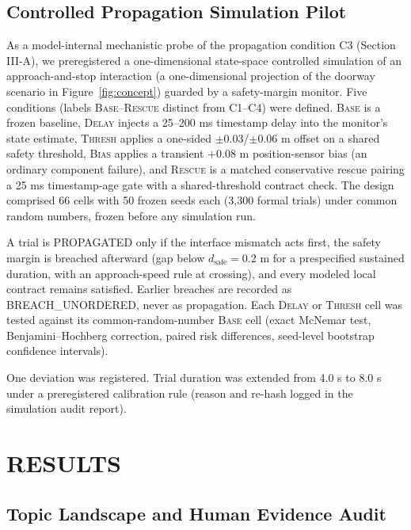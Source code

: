 \documentclass[letterpaper,9pt,conference]{ieeeconf}
\begin{document}
\subsection{Controlled Propagation Simulation Pilot}
As a model-internal mechanistic probe of the propagation condition C3 (Section III-A), we preregistered a one-dimensional state-space controlled simulation of an approach-and-stop interaction (a one-dimensional projection of the doorway scenario in Figure~\ref{fig:concept}) guarded by a safety-margin monitor. Five conditions (labels \textsc{Base}--\textsc{Rescue} distinct from C1--C4) were defined. \textsc{Base} is a frozen baseline, \textsc{Delay} injects a 25--200 ms timestamp delay into the monitor's state estimate, \textsc{Thresh} applies a one-sided $\pm 0.03$/$\pm 0.06$ m offset on a shared safety threshold, \textsc{Bias} applies a transient $+0.08$ m position-sensor bias (an ordinary component failure), and \textsc{Rescue} is a matched conservative rescue pairing a 25 ms timestamp-age gate with a shared-threshold contract check. The design comprised 66 cells with 50 frozen seeds each (3,300 formal trials) under common random numbers, frozen before any simulation run.

A trial is PROPAGATED only if the interface mismatch acts first, the safety margin is breached afterward (gap below $d_{\mathrm{safe}}=0.2$ m for a prespecified sustained duration, with an approach-speed rule at crossing), and every modeled local contract remains satisfied. Earlier breaches are recorded as BREACH\_UNORDERED, never as propagation. Each \textsc{Delay} or \textsc{Thresh} cell was tested against its common-random-number \textsc{Base} cell (exact McNemar test, Benjamini--Hochberg correction, paired risk differences, seed-level bootstrap confidence intervals).

One deviation was registered. Trial duration was extended from 4.0 s to 8.0 s under a preregistered calibration rule (reason and re-hash logged in the simulation audit report).

\section{RESULTS}

\subsection{Topic Landscape and Human Evidence Audit}
\end{document}
